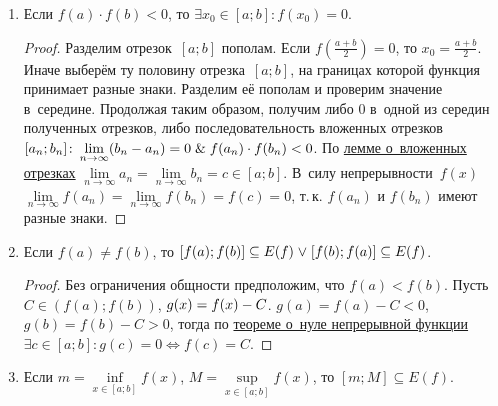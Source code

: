 \begin{enumerate}
	\item \begin{theorem}
	\label{th:zero_of_continuous_function}
	Если $f(a) \cdot f(b) < 0$, то $\exists x_0 \in [a; b] \colon f(x_0) = 0$.
	\end{theorem}
	\begin{proof}
	Разделим отрезок~$[a; b]$ пополам.
	Если $f\left( \frac{a + b}2 \right) = 0$, то $x_0 = \frac{a + b}2$.
	Иначе выберём ту половину отрезка~$[a; b]$, на границах которой функция принимает разные знаки.
	Разделим её пополам и проверим значение в~середине.
	Продолжая таким образом, получим либо $0$ в~одной из середин полученных отрезков, либо последовательность вложенных отрезков~$[a_n; b_n] \colon \lim\limits_{n \to \infty} (b_n - a_n) = 0 \mathrel{\&} f(a_n) \cdot f(b_n) < 0$.
	По \hyperref[lemma:about_nested_intervals]{лемме о~вложенных отрезках} $\lim\limits_{n \to \infty} a_n = \lim\limits_{n \to \infty} b_n = c \in [a; b]$.
	В~силу непрерывности~$f(x)$ $\lim\limits_{n \to \infty} f(a_n) = \lim\limits_{n \to \infty} f(b_n) = f(c) = 0$, т.\,к. $f(a_n)$ и $f(b_n)$ имеют разные знаки.
	\end{proof}
	
	\item \begin{theorem}
	\label{th:intermediate_value}
	Если $f(a) \neq f(b)$, то $[f(a); f(b)] \opbr\subseteq E(f) \opbr\lOr [f(b); f(a)] \opbr\subseteq E(f)$.
	\end{theorem}
	\begin{proof}
	Без ограничения общности предположим, что $f(a) < f(b)$.
	Пусть $C \in (f(a); f(b))$, $g(x) \opbr= f(x) - C$.
	$g(a) = f(a) - C < 0$, $g(b) = f(b) - C > 0$, тогда по \hyperref[th:zero_of_continuous_function]{теореме о~нуле непрерывной функции} $\exists c \in [a; b] \colon \allowbreak g(c) = 0 \Leftrightarrow f(c) = C$.
	\end{proof}
	
	\item Если $m = \inf\limits_{x \in [a; b]} f(x)$, $M = \sup\limits_{x \in [a; b]} f(x)$, то $[m; M] \subseteq E(f)$.
\end{enumerate}
